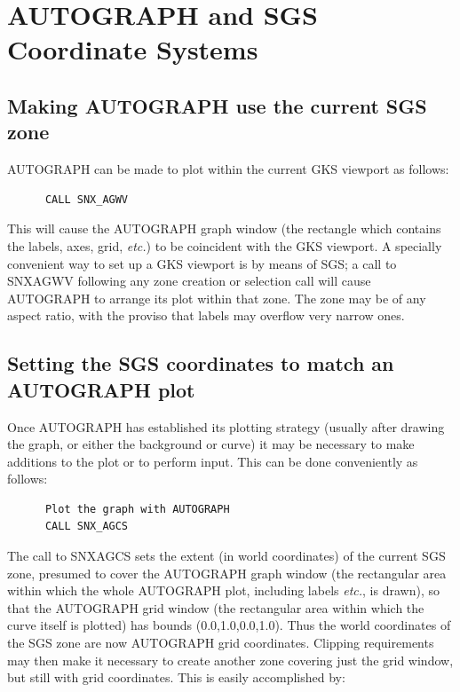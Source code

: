 \documentclass[twoside,11pt]{article}
\renewcommand{\_}{\texttt{\symbol{95}}}
\begin{document}
\section {AUTOGRAPH and SGS Coordinate Systems} \label{coord_sect}

\subsection {Making AUTOGRAPH use the current SGS zone}

AUTOGRAPH can be made to plot within the current GKS viewport as follows:

\begin{verbatim}
      CALL SNX_AGWV
\end{verbatim}

This will cause the AUTOGRAPH graph window (the rectangle which
contains the labels, axes, grid, {\em etc.}) to be coincident with the GKS
viewport. A specially convenient way to set up a GKS viewport is by means of
SGS; a call to SNX\_AGWV following any zone creation or selection call will
cause AUTOGRAPH to arrange its plot within that zone.
The zone may be of any aspect ratio,
with the proviso that labels may overflow very narrow ones.


\subsection {Setting the SGS coordinates to match an AUTOGRAPH plot}

Once AUTOGRAPH has established its plotting strategy (usually
after drawing the graph, or either the background or curve) it
may be necessary to make additions to the plot or to perform input.
This can be done conveniently as follows:

\begin{verbatim}
      Plot the graph with AUTOGRAPH
      CALL SNX_AGCS
\end{verbatim}

The call to SNX\_AGCS sets the extent (in world coordinates) of the
current SGS zone, presumed to cover the AUTOGRAPH graph
window (the rectangular area within which the whole AUTOGRAPH
plot, including labels {\em etc.}, is drawn), so that the AUTOGRAPH
grid window (the rectangular
area within which the curve itself is plotted) has bounds
(0.0,1.0,0.0,1.0).
Thus the world coordinates of
the SGS zone are now AUTOGRAPH grid coordinates.
Clipping requirements may then make it necessary
to create another zone covering just the grid window, but
still with grid coordinates.
This is easily accomplished by:
\end{document}

